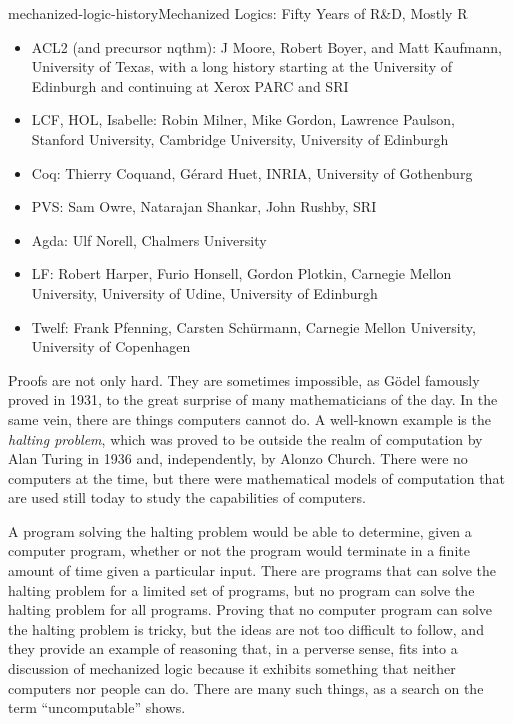\begin{aside}{mechanized-logic-history}{Mechanized Logics: Fifty Years of R\&D, Mostly R}
\begin{itemize}
\item ACL2 (and precursor nqthm): J Moore, Robert Boyer, and Matt Kaufmann, University of Texas, with a long history starting at the University of Edinburgh and continuing at Xerox PARC and SRI
\item LCF, HOL, Isabelle: Robin Milner, Mike Gordon, Lawrence Paulson, Stanford University, Cambridge University, University of Edinburgh
\item Coq: Thierry Coquand, G\'erard Huet, INRIA, University of Gothenburg
\item PVS: Sam Owre, Natarajan Shankar, John Rushby, SRI
\item Agda: Ulf Norell, Chalmers University
\item LF: Robert Harper, Furio Honsell, Gordon Plotkin, Carnegie Mellon University, University of Udine, University of Edinburgh
\item Twelf: Frank Pfenning, Carsten Sch\"urmann, Carnegie Mellon University, University of Copenhagen
\end{itemize}
\end{aside}

Proofs are not only hard.
They are sometimes impossible, as G\"odel famously proved in 1931,
to the great surprise of many mathematicians of the day.
In the same vein, there are things computers cannot do.
A well-known example is the \emph{halting problem}, which
was proved to be outside the realm of computation
by Alan Turing in 1936
and, independently, by Alonzo Church.
There were no computers at the time,
but there were mathematical models of computation
that are used still today to study the capabilities of computers.

A program solving the
halting problem would be able to determine,
given a computer program, whether or not the program would terminate
in a finite amount of time given a particular input.
There are programs that can solve the halting problem for
a limited set of programs,
but no program can solve the halting problem for all programs.
Proving that no computer program can solve the halting problem is tricky,
but the ideas are not too difficult to follow, and
they provide an example of reasoning that,
in a perverse sense, fits into a discussion of mechanized logic
because it exhibits something that neither computers
nor people can do. There are many such things, as a search
on the term ``uncomputable'' shows.

